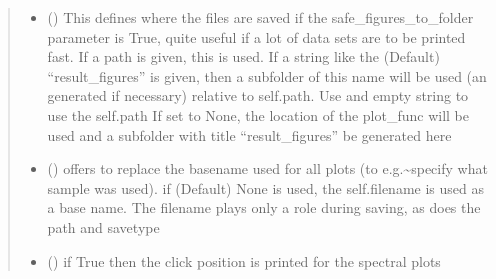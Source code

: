 \documentclass[letterpaper,10pt,english]{sphinxmanual}
\begin{document}
\begin{fulllineitems}
\begin{quote}
\begin{description}
\begin{itemize}
\item {} 
 (\sphinxstyleliteralemphasis{\sphinxupquote{, }}\sphinxstyleliteralemphasis{\sphinxupquote{, }}) \textendash{} This defines where the files are saved if the safe\_figures\_to\_folder parameter is True,
quite useful if a lot of data sets are to be printed fast.
If a path is given, this is used. If a string like the (Default) “result\_figures” is given,
then a subfolder of this name will be used (an generated if necessary)
relative to self.path. Use and empty string to use the self.path
If set to None, the location of the plot\_func will be used and
a subfolder with title “result\_figures” be generated here

\item {} 
 (\sphinxstyleliteralemphasis{\sphinxupquote{, }}) \textendash{} offers to replace the base\sphinxhyphen{}name used for all plots (to e.g.\textasciitilde{}specify what sample was used).
if (Default) None is used, the self.filename is used as a base name. The filename plays only a
role during saving, as does the path and savetype

\item {} 
 (\sphinxstyleliteralemphasis{\sphinxupquote{, }}) \textendash{} if True then the click position is printed for the spectral plots

\end{itemize}

\end{description}\end{quote}

\end{fulllineitems}

\end{document}
